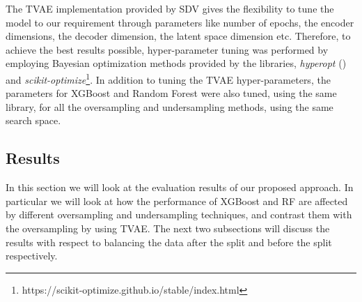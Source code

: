 \documentclass[twoside,11pt]{article}
\begin{document}
\begin{keywords}
The TVAE implementation provided by SDV gives the flexibility to tune the model to our requirement through parameters like number of epochs, the encoder dimensions, the decoder dimension, the latent space dimension etc. Therefore, to achieve the best results possible, hyper-parameter tuning was performed by employing Bayesian optimization methods provided by the libraries, \emph{hyperopt} (\citealp{bergstraMakingScienceModel}) and \emph{scikit-optimize}\footnote{https://scikit-optimize.github.io/stable/index.html}. In addition to tuning the TVAE hyper-parameters, the parameters for XGBoost and Random Forest were also tuned, using the same library, for all the oversampling and undersampling methods, using the same search space.

\subsection{Results}
In this section we will look at the evaluation results of our proposed approach. In particular we will look at how the performance of XGBoost and RF are affected by different oversampling and undersampling techniques, and contrast them with the oversampling by using TVAE. The next two subsections will discuss the results with respect to balancing the data after the split and before the split respectively.


\end{keywords}
\end{document}
